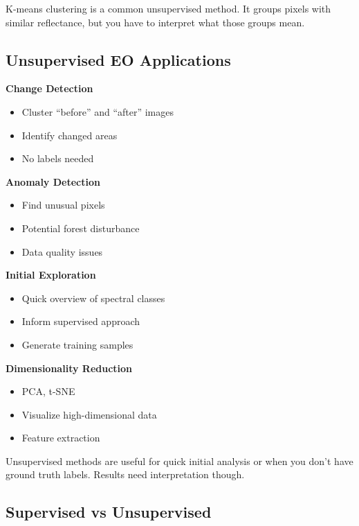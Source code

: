 \documentclass[
  letterpaper,
  DIV=11,
  numbers=noendperiod]{scrartcl}
\providecommand{\tightlist}{%
  \setlength{\itemsep}{0pt}\setlength{\parskip}{0pt}}
\begin{document}
K-means clustering is a common unsupervised method. It groups pixels
with similar reflectance, but you have to interpret what those groups
mean.

\subsection{Unsupervised EO
Applications}\label{unsupervised-eo-applications}

\textbf{Change Detection}

\begin{itemize}
\tightlist
\item
  Cluster ``before'' and ``after'' images
\item
  Identify changed areas
\item
  No labels needed
\end{itemize}

\textbf{Anomaly Detection}

\begin{itemize}
\tightlist
\item
  Find unusual pixels
\item
  Potential forest disturbance
\item
  Data quality issues
\end{itemize}

\textbf{Initial Exploration}

\begin{itemize}
\tightlist
\item
  Quick overview of spectral classes
\item
  Inform supervised approach
\item
  Generate training samples
\end{itemize}

\textbf{Dimensionality Reduction}

\begin{itemize}
\tightlist
\item
  PCA, t-SNE
\item
  Visualize high-dimensional data
\item
  Feature extraction
\end{itemize}

Unsupervised methods are useful for quick initial analysis or when you
don't have ground truth labels. Results need interpretation though.

\subsection{Supervised vs
Unsupervised}\label{supervised-vs-unsupervised}
\end{document}
